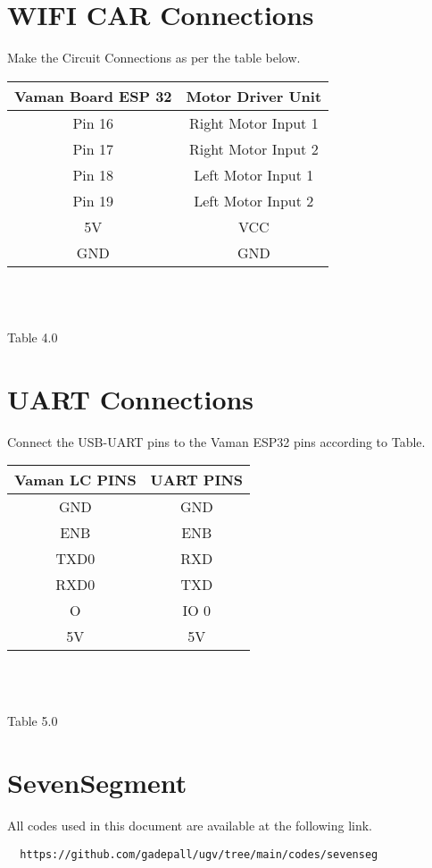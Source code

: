 \documentclass[journal,15pt,twocolumn,tikz, border=5mm]{IEEEtran}
\begin{document}
\section{WIFI CAR Connections}
\raggedright
Make the Circuit Connections as per the table below.\\
\vspace{0.25cm}
\centering
\begin{tabular}{|c|c|}
\hline
Vaman Board ESP 32 & Motor Driver Unit\\
\hline
Pin 16 & Right Motor Input 1\\
\hline
Pin 17 & Right Motor Input 2\\
\hline
Pin 18 & Left Motor Input 1\\
\hline
Pin 19 & Left Motor Input 2\\
\hline
5V & VCC\\
\hline
GND & GND\\
\hline
\end{tabular}\\
\
\centerline{Table 4.0}

\section{UART Connections}
\raggedright
Connect the USB-UART pins to the Vaman ESP32 pins according to Table.\\
\vspace{0.25cm}
\centering
\begin{tabular}{|c|c|}
\hline
Vaman LC PINS & UART PINS\\
\hline
GND & GND\\
\hline
ENB & ENB\\
\hline
TXD0 & RXD\\
\hline
RXD0 & TXD\\
\hline
O & IO 0\\
\hline
5V & 5V\\
\hline
\end{tabular}\\
\
\centerline{Table 5.0}

\section{SevenSegment}
All codes used in this document are available at the following link.

\begin{lstlisting}
  https://github.com/gadepall/ugv/tree/main/codes/sevenseg
\end{lstlisting}
\end{document}
